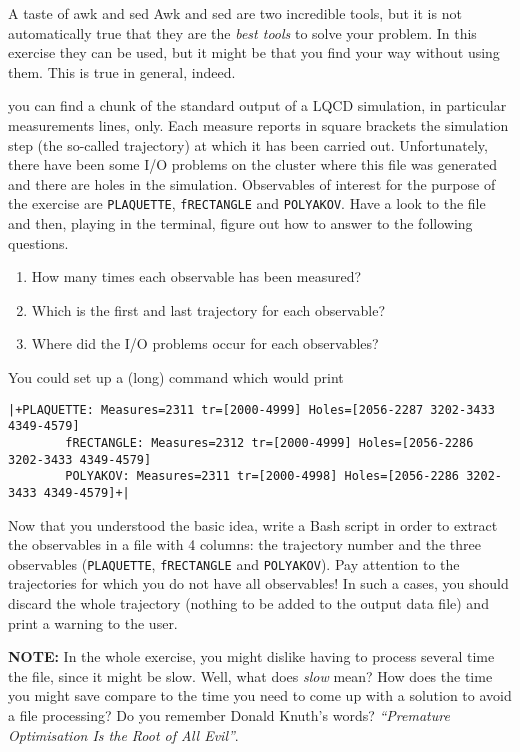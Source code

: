 
\begin{exercise}[Inspirational]{A taste of awk and sed}
    Awk and sed are two incredible tools, but it is not automatically true that they are the \emph{best tools} to solve your problem.
    In this exercise they can be used, but it might be that you find your way without using them.
    This is true in general, indeed.

     you can find a chunk of the standard output of a LQCD simulation, in particular measurements lines, only.
    Each measure reports in square brackets the simulation step (the so-called trajectory) at which it has been carried out.
    Unfortunately, there have been some I/O problems on the cluster where this file was generated and there are holes in the simulation.
    Observables of interest for the purpose of the exercise are \texttt{PLAQUETTE}, \texttt{fRECTANGLE} and \texttt{POLYAKOV}.
    Have a look to the file and then, playing in the terminal, figure out how to answer to the following questions.
    \begin{enumerate}
        \item How many times each observable has been measured?
        \item Which is the first and last trajectory for each observable?
        \item Where did the I/O problems occur for each observables?
    \end{enumerate}
    You could set up a (long) command which would print
    \begin{lstlisting}[style=MyBash, xleftmargin=3mm, xrightmargin=1mm]
        |+PLAQUETTE: Measures=2311 tr=[2000-4999] Holes=[2056-2287 3202-3433 4349-4579]
        fRECTANGLE: Measures=2312 tr=[2000-4999] Holes=[2056-2286 3202-3433 4349-4579]
        POLYAKOV: Measures=2311 tr=[2000-4998] Holes=[2056-2286 3202-3433 4349-4579]+|
    \end{lstlisting}

    Now that you understood the basic idea, write a Bash script in order to extract the observables in a file with 4 columns: the trajectory number and the three observables (\texttt{PLAQUETTE}, \texttt{fRECTANGLE} and \texttt{POLYAKOV}).
    Pay attention to the trajectories for which you do not have all observables!
    In such a cases, you should discard the whole trajectory (nothing to be added to the output data file) and print a warning to the user.

    \textbf{NOTE:} In the whole exercise, you might dislike having to process several time the file, since it might be slow.
    Well, what does \emph{slow} mean?
    How does the time you might save compare to the time you need to come up with a solution to avoid a file processing?
    Do you remember Donald Knuth's words? \emph{``Premature Optimisation Is the Root of All Evil''}.
\end{exercise}